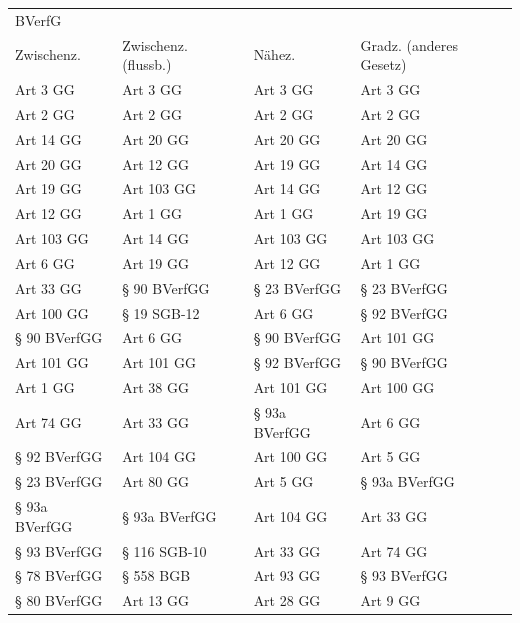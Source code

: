 \begin{tabular}{llll}
\toprule
\multicolumn{4}{l}{BVerfG} \\
   Zwischenz. & Zwischenz. (flussb.) &        Nähez. & Gradz. (anderes Gesetz) \\
\midrule
     Art 3 GG &             Art 3 GG &      Art 3 GG &                Art 3 GG \\
     Art 2 GG &             Art 2 GG &      Art 2 GG &                Art 2 GG \\
    Art 14 GG &            Art 20 GG &     Art 20 GG &               Art 20 GG \\
    Art 20 GG &            Art 12 GG &     Art 19 GG &               Art 14 GG \\
    Art 19 GG &           Art 103 GG &     Art 14 GG &               Art 12 GG \\
    Art 12 GG &             Art 1 GG &      Art 1 GG &               Art 19 GG \\
   Art 103 GG &            Art 14 GG &    Art 103 GG &              Art 103 GG \\
     Art 6 GG &            Art 19 GG &     Art 12 GG &                Art 1 GG \\
    Art 33 GG &         § 90 BVerfGG &  § 23 BVerfGG &            § 23 BVerfGG \\
   Art 100 GG &          § 19 SGB-12 &      Art 6 GG &            § 92 BVerfGG \\
 § 90 BVerfGG &             Art 6 GG &  § 90 BVerfGG &              Art 101 GG \\
   Art 101 GG &           Art 101 GG &  § 92 BVerfGG &            § 90 BVerfGG \\
     Art 1 GG &            Art 38 GG &    Art 101 GG &              Art 100 GG \\
    Art 74 GG &            Art 33 GG & § 93a BVerfGG &                Art 6 GG \\
 § 92 BVerfGG &           Art 104 GG &    Art 100 GG &                Art 5 GG \\
 § 23 BVerfGG &            Art 80 GG &      Art 5 GG &           § 93a BVerfGG \\
§ 93a BVerfGG &        § 93a BVerfGG &    Art 104 GG &               Art 33 GG \\
 § 93 BVerfGG &         § 116 SGB-10 &     Art 33 GG &               Art 74 GG \\
 § 78 BVerfGG &            § 558 BGB &     Art 93 GG &            § 93 BVerfGG \\
 § 80 BVerfGG &            Art 13 GG &     Art 28 GG &                Art 9 GG \\

\end{tabular}
